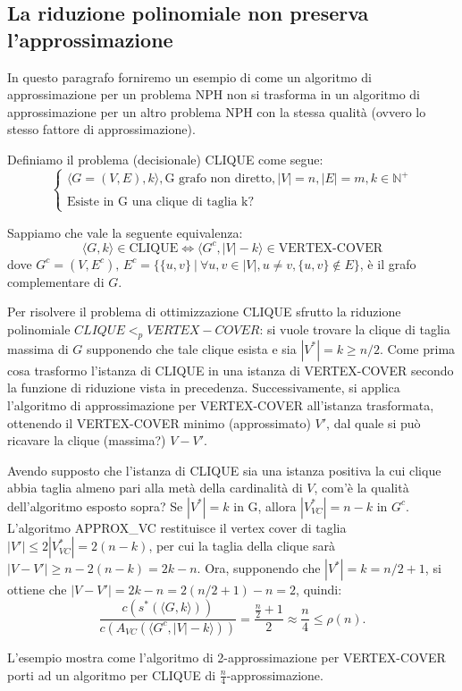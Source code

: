 \subsection{La riduzione polinomiale non preserva l'approssimazione}
In questo paragrafo forniremo un esempio di come un algoritmo di approssimazione per un problema NPH non si trasforma in un algoritmo di approssimazione per un altro problema NPH con la stessa qualità (ovvero lo stesso fattore di approssimazione).

Definiamo il problema (decisionale) CLIQUE come segue:
\[
\begin{cases}
\langle G=(V,E),k\rangle , \mbox{G grafo non diretto}, |V|=n, |E|=m, k \in \mathbb{N}^+ \\
\\
\mbox{Esiste in G una clique di taglia k?}
\end{cases}
\]

Sappiamo che vale la seguente equivalenza:
\[
\langle G,k\rangle  \in \mbox{CLIQUE} \Leftrightarrow \langle G^c,|V|-k\rangle  \in \mbox{VERTEX-COVER}
\]
dove $G^c=(V,E^c),\,E^c=\{\{u,v\}\ |\ \forall u,v \in |V|, u \neq v, \{u,v\} \notin E\}$, è il grafo complementare di $G$.

Per risolvere il problema di ottimizzazione CLIQUE sfrutto la riduzione polinomiale $CLIQUE <_p VERTEX-COVER$: si vuole trovare la clique di taglia massima di $G$ supponendo che tale clique esista e sia $|V^*|=k \geq n/2$. Come prima cosa trasformo l'istanza di CLIQUE in una istanza di VERTEX-COVER secondo la funzione di riduzione vista in precedenza. Successivamente, si applica l'algoritmo di approssimazione per VERTEX-COVER all'istanza trasformata, ottenendo il VERTEX-COVER minimo (approssimato) $V'$, dal quale si può ricavare la clique (massima?) $V-V'$.

Avendo supposto che l'istanza di CLIQUE sia una istanza positiva la cui clique abbia taglia almeno pari alla metà della cardinalità di $V$, com'è la qualità dell'algoritmo esposto sopra? Se $|V^*|=k$ in G, allora $|V^*_{VC}|=n-k$ in $G^c$. L'algoritmo APPROX\_VC restituisce il vertex cover di taglia $|V'| \leq 2|V^*_{VC}|=2(n-k)$, per cui la taglia della clique sarà $|V-V'| \geq n - 2(n-k) = 2k-n$. Ora, supponendo che $|V^*|=k=n/2+1$, si ottiene che $|V-V'|=2k-n=2(n/2+1)-n=2$, quindi:
\[
\frac{c(s^*(\langle G,k\rangle ))}{c(A_{VC}(\langle G^c, |V|-k\rangle ))}=\frac{\frac{n}{2}+1}{2} \approx \frac{n}{4} \leq \rho(n) \mbox{.}
\]

L'esempio mostra come l'algoritmo di 2-approssimazione per VERTEX-COVER porti ad un algoritmo per CLIQUE di $\frac{n}{4}$-approssimazione.
